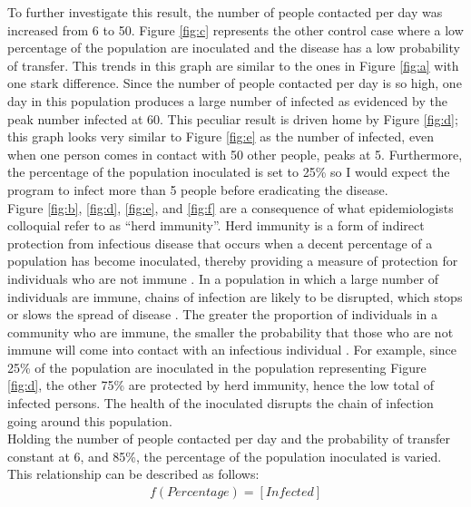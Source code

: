 \documentclass[paper=a4, fontsize=11pt]{scrartcl}
\begin{document}
To further investigate this result, the number of people contacted per day was increased from 6 to 50. Figure \ref{fig:c} represents the other control case where a low percentage of the population are inoculated and the disease has a low probability of transfer. This trends in this graph are similar to the ones in Figure \ref{fig:a} with one stark difference. Since the number of people contacted per day is so high, one day in this population produces a large number of infected  as evidenced by the peak number infected at 60. This peculiar result is driven home by Figure \ref{fig:d}; this graph looks very similar to Figure \ref{fig:e} as the number of infected, even when one person comes in contact with 50 other people, peaks at 5. Furthermore, the percentage of the population inoculated is set to 25\% so I would expect the program to infect more than 5 people before eradicating the disease.\\

Figure \ref{fig:b}, \ref{fig:d}, \ref{fig:e}, and \ref{fig:f} are a consequence of what epidemiologists colloquial refer to as ``herd immunity''. Herd immunity is a form of indirect protection from infectious disease that occurs when a decent percentage of a population has become inoculated, thereby providing a measure of protection for individuals who are not immune \cite{herd}. In a population in which a large number of individuals are immune, chains of infection are likely to be disrupted, which stops or slows the spread of disease \cite{herd2}. The greater the proportion of individuals in a community who are immune, the smaller the probability that those who are not immune will come into contact with an infectious individual \cite{herd}. For example, since 25\% of the population are inoculated in the population representing Figure \ref{fig:d}, the other 75\% are protected by herd immunity, hence the low total of infected persons. The health of the inoculated disrupts the chain of infection going around this population.\\

Holding the number of people contacted per day and the probability of transfer constant at 6, and 85\%, the percentage of the population inoculated is varied. This relationship can be described as follows:\\

\begin{align*} 
   f(Percentage) = [Infected] \\
\end{align*}
\end{document}
